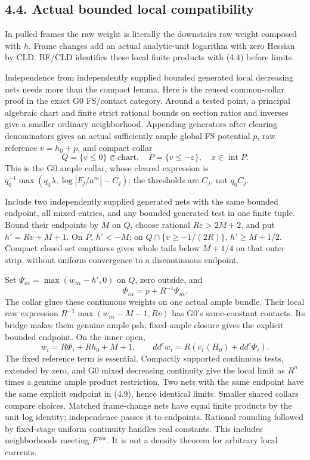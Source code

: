 \documentclass[
  10pt,
]{article}
\begin{document}
\subsection{4.4. Actual bounded local
compatibility}\label{actual-bounded-local-compatibility}

In pulled frames the raw weight is literally the downstairs raw weight
composed with \(h\). Frame changes add an actual analytic-unit logarithm
with zero Hessian by CLD. BE/CLD identifies these local finite products
with (4.4) before limits.

Independence from independently supplied bounded generated local
decreasing nets needs more than the compact lemma. Here is the reused
common-collar proof in the exact G0 FS/contact category. Around a tested
point, a principal algebraic chart and finite strict rational bounds on
section ratios and inverses give a smaller ordinary neighborhood.
Appending generators after clearing denominators gives an actual
sufficiently ample global FS potential \(p\), raw reference \(v=h_0+p\),
and compact collar
\[Q=\{v\le0\}\Subset\text{chart},\quad P=\{v\le-\varepsilon\},
\quad x\in\operatorname{int}P. \tag{4.8}\] This is the G0 ample collar,
whose cleared expression is
\(q_0^{-1}\max(q_0\lambda,\log|F_j/a^m|-C_j)\); the thresholds are
\(C_j\), not \(q_0 C_j\).

Include two independently supplied generated nets with the same bounded
endpoint, all mixed entries, and any bounded generated test in one
finite tuple. Bound their endpoints by \(M\) on \(Q\), choose rational
\(R\varepsilon>2M+2\), and put \(h'=Rv+M+1\). On \(P\), \(h'<-M\); on
\(Q\cap\{v\ge-1/(2R)\}\), \(h'\ge M+1/2\). Compact closed-set emptiness
gives whole tails below \(M+1/4\) on that outer strip, without uniform
convergence to a discontinuous endpoint.

Set \(\Psi_{i\alpha}=\max(w_{i\alpha}-h',0)\) on \(Q\), zero outside,
and \[\Phi_{i\alpha}=p+R^{-1}\Psi_{i\alpha}. \tag{4.9}\] The collar
glues these continuous weights on one actual ample bundle. Their local
raw expression \(R^{-1}\max(w_{i\alpha}-M-1,Rv)\) has G0's same-constant
contacts. Its bridge makes them genuine ample psh; fixed-ample closure
gives the explicit bounded endpoint. On the inner open,
\[w_i=R\Phi_i+Rh_0+M+1,\qquad
dd^c w_i=R(c_1(H_0)+dd^c\Phi_i). \tag{4.10}\] The fixed reference term
is essential. Compactly supported continuous tests, extended by zero,
and G0 mixed decreasing continuity give the local limit as \(R^n\) times
a genuine ample product restriction. Two nets with the same endpoint
have the same explicit endpoint in (4.9), hence identical limits.
Smaller shared collars compare choices. Matched frame-change nets have
equal finite products by the unit-log identity; independence passes it
to endpoints. Rational rounding followed by fixed-stage uniform
continuity handles real constants. This includes neighborhoods meeting
\(F^{\rm an}\). It is not a density theorem for arbitrary local
currents.
\end{document}
